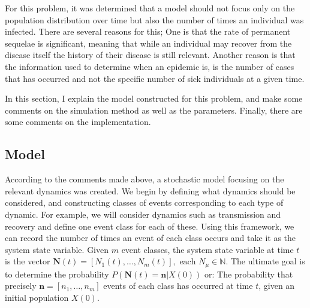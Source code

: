 \documentclass[10pt,a4paper]{article}
\begin{document}
For this problem, it was determined that a model should not focus only on the population distribution over time but also the number of times an individual was infected. There are several reasons for this; One is that the rate of permanent sequelae is significant, meaning that while an individual may recover from the disease itself the history of their disease is still relevant. Another reason is that the information used to determine when an epidemic is, is the number of cases that has occurred and not the specific number of sick individuals at a given time.

In this section, I explain the model constructed for this problem, and make some comments on the simulation method as well as the parameters. Finally, there are some comments on the implementation.

%
%


\subsection{Model}

According to the comments made above, a stochastic model focusing on the relevant dynamics was created. We begin by defining what dynamics should be considered, and constructing classes of events corresponding to each type of dynamic. For example, we will consider dynamics such as transmission and recovery and define one event class for each of these. Using this framework, we can record the number of times an event of each class occurs and take it as the system state variable. Given $m$ event classes, the system state variable at time $t$ is the vector $\bm{N}\left( t \right) = \left[ N_1 \left( t \right), \ldots, N_m \left( t \right) \right], \textrm{ each }N_\mu \in \mathbb{N}$. The ultimate goal is to determine the probability $P \left( \bm{N}\left( t \right)  = \bm{n} | X\left( 0 \right) \right)$ or: The probability that precisely $\bm{n} = \left[ n_1, \ldots, n_m \right]$ events of each class has occurred at time $t$, given an initial population $X\left( 0 \right)$.
\end{document}
